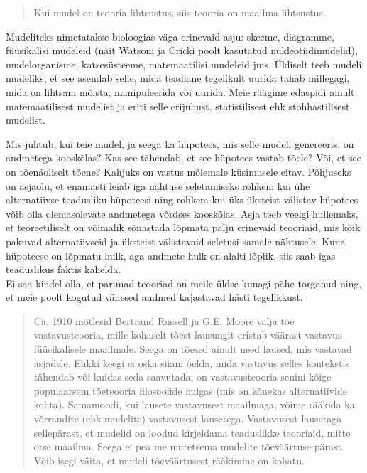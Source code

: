 \documentclass[]{book}
\begin{document}
\begin{quote}
Kui mudel on teooria lihtsustus, siis teooria on maailma lihtsustus.
\end{quote}

Mudeliteks nimetatakse bioloogias väga erinevaid asju: skeeme, diagramme, füüsikalisi mudeleid (näit Watsoni ja Cricki poolt kasutatud nukleotiidimudelid), mudelorganisme, katsesüsteeme, matemaatilisi mudeleid jms. Üldiselt teeb mudeli mudeliks, et see asendab selle, mida teadlane tegelikult uurida tahab millegagi, mida on lihtsam mõista, manipuleerida või uurida. Meie räägime edaspidi ainult matemaatilisest mudelist ja eriti selle erijuhust, statistilisest ehk stohhastilisest mudelist.

Mis juhtub, kui teie mudel, ja seega ka hüpotees, mis selle mudeli genereeris, on andmetega kooskõlas? Kas see tähendab, et see hüpotees vastab tõele? Või, et see on tõenäoliselt tõene? Kahjuks on vastus mõlemale küsimusele eitav. Põhjuseks on asjaolu, et enamasti leiab iga nähtuse seletamiseks rohkem kui ühe alternatiivse teadusliku hüpoteesi ning rohkem kui üks üksteist välistav hüpotees võib olla olemasolevate andmetega võrdses kooskõlas. Asja teeb veelgi hullemaks, et teoreetiliselt on võimalik sõnastada lõpmata palju erinevaid teooriaid, mis kõik pakuvad alternatiivseid ja üksteist välistavaid seletusi samale nähtusele. Kuna hüpoteese on lõpmatu hulk, aga andmete hulk on alalti lõplik, siis saab igas teaduslikus faktis kahelda.\\
Ei saa kindel olla, et parimad teooriad on meile üldse kunagi pähe torganud ning, et meie poolt kogutud vähesed andmed kajastavad hästi tegelikkust.

\begin{quote}
Ca. 1910 mõtlesid Bertrand Russell ja G.E. Moore välja tõe vastavusteooria, mille kohaselt tõest lausungit eristab väärast vastavus füüsikalisele maailmale. Seega on tõesed ainult need laused, mis vastavad asjadele. Ehkki keegi ei oska siiani öelda, mida vastavus selles kontekstis tähendab või kuidas seda saavutada, on vastavusteooria senini kõige populaarsem tõeteooria filosoofide hulgas (mis on kõnekas alternatiivide kohta). Samamoodi, kui lausete vastavusest maailmaga, võime rääkida ka võrrandite (ehk mudelite) vastavusest lausetega. Vastavusest lausetaga sellepärast, et mudelid on loodud kirjeldama teaduslikke teooriaid, mitte otse maailma. Seega ei pea me muretsema mudelite tõeväärtuse pärast. Võib isegi väita, et mudeli tõeväärtusest rääkimine on kohatu.
\end{quote}
\end{document}

